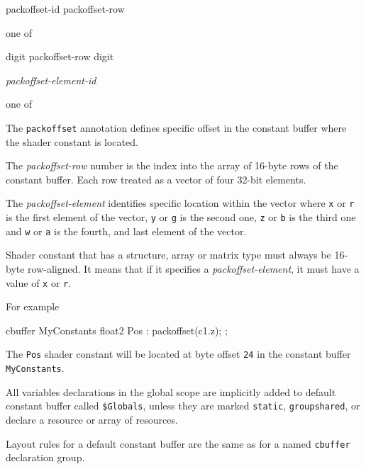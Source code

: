 \begin{grammar}
  \br
   packoffset-id packoffset-row  \terminal{)}

  \textnormal{one of}\br

  \br
  digit\br
  packoffset-row digit

  \br
   \textit{packoffset-element-id}

  \textnormal{one of}\br
  \br
\end{grammar}

\p The \texttt{packoffset} annotation defines specific offset in the constant
buffer where the shader constant is located.

\p The \textit{packoffset-row} number is the index into the array of 16-byte
rows of the constant buffer. Each row treated as a vector of four 32-bit
elements.

\p The \textit{packoffset-element} identifies specific location within the
vector where \texttt{x} or \texttt{r} is the first element of the vector,
\texttt{y} or \texttt{g} is the second one, \texttt{z} or \texttt{b} is the
third one and \texttt{w} or \texttt{a} is the fourth, and last element of the
vector.

\p Shader constant that has a structure, array or matrix type must always be
16-byte row-aligned. It means that if it specifies a
\textit{packoffset-element}, it must have a value of \texttt{x} or \texttt{r}.

\p For example

\begin{HLSL}
  cbuffer MyConstants {
    float2 Pos : packoffset(c1.z);
  };
\end{HLSL}

The \texttt{Pos} shader constant will be located at byte offset \texttt{24} in
the constant buffer \texttt{MyConstants}.


\p All variables declarations in the global scope are implicitly added to
default constant buffer called \texttt{\$Globals}, unless they are marked
\texttt{static}, \texttt{groupshared}, or declare a resource or array of
resources.

\p Layout rules for a default constant buffer are the same as for a named
\texttt{cbuffer} declaration group.


